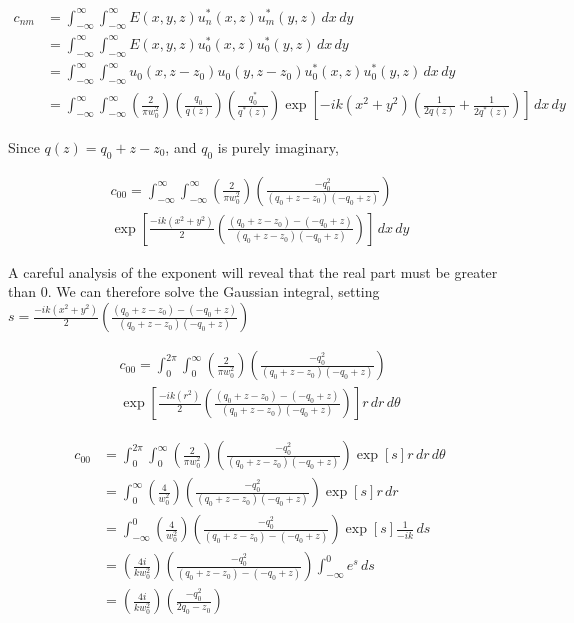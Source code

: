 \newcommand{\intinfxy}[1]{\int^{\infty}_{- \infty} \int^{\infty}_{- \infty} #1 \,dx \,dy}
\newcommand{\intinfrt}[1]{\int^{2 \pi}_{0} \int^{\infty}_{0} #1 r \,dr \,d\theta}


\begin{align}
    c_{nm} &= \intinfxy{
    E(x,y,z) u_n^*(x,z)u_m^*(y,z)}
\\  &= \intinfxy{
    E(x,y,z) u_0^*(x,z)u_0^*(y,z)}
\\  &= \intinfxy{
    u_0(x,z-z_0)u_0(y,z-z_0) u_0^*(x,z)u_0^*(y,z)}
\\  &= \intinfxy{ \left( \frac{2}{\pi w^2_0} \right) \left( \frac{q_0}{q(z)} \right)
    \left( \frac{q^*_0}{q^*(z)} \right) \exp \left[-ik \left( x^2 + y^2  \right)
    \left( \frac{1}{2q(z)} + \frac{1}{2q^*(z)} \right) \right]}
\end{align}

Since $q(z) = q_0 + z - z_0$, and $q_0$ is purely imaginary,


\begin{multline}
    c_{00} = \intinfxy{ \left( \frac{2}{\pi w^2_0} \right)
    \left( \frac{-q^2_0}{(q_0+z-z_0)(-q_0+z)} \right) \\
    \exp \left[
    \frac{-ik \left( x^2 + y^2  \right)}{2} \left( \frac{(q_0+z-z_0)-(-q_0+z)}{(q_0+z-z_0)(-q_0+z)} \right)
    \right]}
\end{multline}

A careful analysis of the exponent will reveal that the real part must be greater than $0$.
We can therefore solve the Gaussian integral, setting $s = \frac{-ik \left( x^2 + y^2
\right)}{2} \left( \frac{(q_0+z-z_0)-(-q_0+z)}{(q_0+z-z_0)(-q_0+z)} \right)$

\begin{multline}
    c_{00} = \intinfrt{ \left( \frac{2}{\pi w^2_0} \right)
    \left( \frac{-q^2_0}{(q_0+z-z_0)(-q_0+z)} \right) \\
    \exp \left[
    \frac{-ik \left( r^2  \right)}{2} \left( \frac{(q_0+z-z_0)-(-q_0+z)}{(q_0+z-z_0)(-q_0+z)} \right)
    \right]}
\end{multline}

\begin{align}
    c_{00} &= \intinfrt{ \left( \frac{2}{\pi w^2_0} \right)
    \left( \frac{-q^2_0}{(q_0+z-z_0)(-q_0+z)} \right)
    \exp \left[
    s
    \right]}
\\  &= \int^{\infty}_{0} \left( \frac{4}{w^2_0} \right)
    \left( \frac{-q^2_0}{(q_0+z-z_0)(-q_0+z)} \right)
    \exp \left[
    s
    \right] r \,dr
\\  &= \int^{0}_{-\infty} \left( \frac{4}{w^2_0} \right)
    \left( \frac{-q^2_0}{(q_0+z-z_0)-(-q_0+z)} \right)
    \exp \left[ s
    \right] \frac{1}{-ik} \,ds
\\  &= \left( \frac{4i}{kw^2_0} \right)
    \left( \frac{-q^2_0}{(q_0+z-z_0)-(-q_0+z)} \right)
    \int^0_{-\infty} e^s \,ds
\\  &= \left( \frac{4i}{kw^2_0} \right)
    \left( \frac{-q^2_0}{2q_0-z_0} \right)
\end{align}


